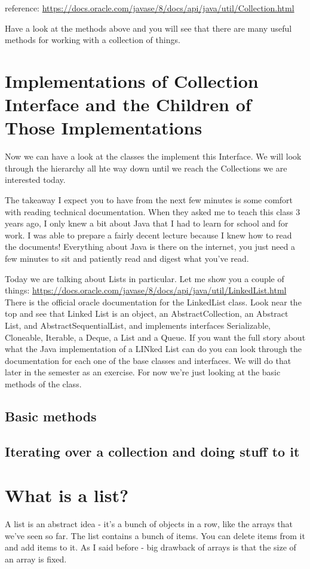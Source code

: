\documentclass[12pt]{article}
\begin{document}
reference:
\url{https://docs.oracle.com/javase/8/docs/api/java/util/Collection.html}

Have a look at the methods above and you will see that there are many useful
methods for working with a collection of things.


\section{Implementations of Collection Interface and the Children of Those
Implementations}
Now we can have a look at the classes the implement this Interface.
We will look through the hierarchy all hte way down until we reach the
Collections we are interested today.

The takeaway I expect you to have from the next few minutes is some comfort with
reading technical documentation. When they asked me to teach this class 3 years
ago, I only knew a bit about Java that I had to learn for school and for work. I
was able to prepare a fairly decent lecture because I knew how to read the
documents! Everything about Java is there on the internet, you just need a few
minutes to sit and patiently read and digest what you've read.

Today we are talking about Lists in particular. Let me show you a couple of
things:
\url{https://docs.oracle.com/javase/8/docs/api/java/util/LinkedList.html}
There  is the official oracle documentation for the LinkedList class.
Look near the top and see that  Linked List is an object, an AbstractCollection,
an Abstract List, and AbstractSequentialList, and implements interfaces
Serializable, Cloneable,  Iterable, a Deque, a List and a Queue.
If you want the full story about what the Java implementation of  a LINked List
can do you can look through the documentation for each one of the base classes
and interfaces. We will do that later in the semester as an exercise. For now
we're just looking at the basic methods of the class.

\subsection{Basic methods}
\subsection{Iterating over a collection and doing stuff to it}


\section{What is a list?}
A list is an abstract idea - it's a bunch of objects in a row, like the arrays that we've seen so far. The list contains a bunch of items. You can delete items from it and add items to it. As I said before - big drawback of arrays is that the size of an array is fixed.
\end{document}
